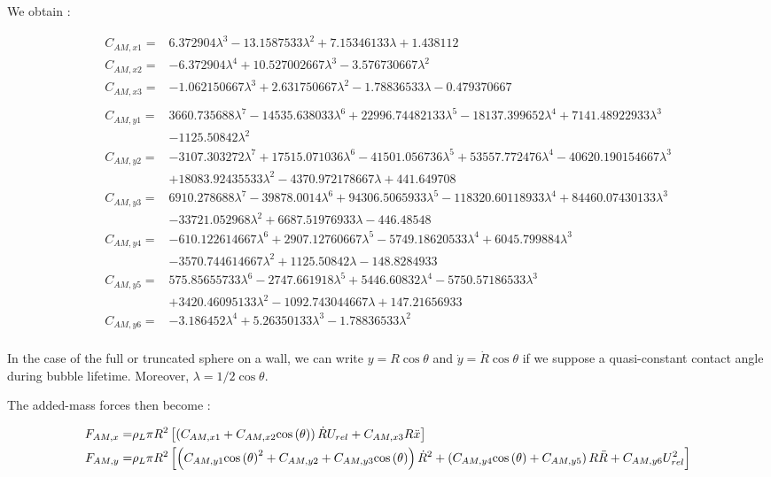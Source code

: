 We obtain :

\begin{align}
C_{AM,x1}=&6.372904 \lambda^{3} - 13.1587533\lambda^{2} + 7.15346133\lambda + 1.438112\\
C_{AM,x2}=&-6.372904\lambda^{4}+10.527002667\lambda^{3}-3.576730667\lambda^{2}\\
C_{AM,x3}=&-1.062150667\lambda^{3} + 2.631750667\lambda^{2}-1.78836533\lambda-0.479370667\\
\nonumber \\
\nonumber C_{AM,y1}=& 3660.735688\lambda^{7} - 14535.638033\lambda^{6} + 22996.74482133\lambda^{5} - 18137.399652\lambda^{4} + 7141.48922933\lambda^{3}\\& - 1125.50842 \lambda^{2}\\
\nonumber C_{AM,y2}=&-3107.303272\lambda^{7} + 17515.071036\lambda^{6} - 41501.056736\lambda^{5} + 53557.772476 \lambda^{4} - 40620.190154667\lambda^{3} \\& + 18083.92435533\lambda^{2} - 4370.972178667\lambda + 441.649708\\
\nonumber C_{AM,y3}=&6910.278688 \lambda^7 - 39878.0014 \lambda^6 + 94306.5065933 \lambda^5 - 118320.60118933 \lambda^4 + 84460.07430133 \lambda^3\\ &- 33721.052968 \lambda^2 + 6687.51976933 \lambda - 446.48548 \\
\nonumber C_{AM,y4}=&-610.122614667 \lambda^6 + 2907.12760667 \lambda^5 - 5749.18620533 \lambda^4 + 6045.799884 \lambda^3 \\&- 3570.744614667 \lambda^2 + 1125.50842 \lambda - 148.8284933 \\
\nonumber C_{AM,y5}=&575.85655733 \lambda^6 - 2747.661918 \lambda^5 + 5446.60832 \lambda^4 - 5750.57186533 \lambda^3 \\& + 3420.46095133 \lambda^2 - 1092.743044667 \lambda + 147.21656933 \\
C_{AM,y6}=& -3.186452 \lambda^4 + 5.26350133 \lambda^3 - 1.78836533 \lambda^2\\
\end{align}


\npar

In the case of the full or truncated sphere on a wall, we can write $y=R\cos{\theta}$ and $\dot{y}=\dot{R}\cos{\theta}$ if we suppose a quasi-constant contact angle during bubble lifetime. Moreover, $\lambda=1/2\cos{\theta}$. 

The added-mass forces then become :

\begin{align}
F_{AM,x}=&\rho_{L}\pi R^{2}\left[ \left( C_{AM,x1}+C_{AM,x2}\mathrm{cos}\left( \theta \right) \right)\dot{R}U_{rel}+C_{AM,x3}R\ddot{x} \right]\\
F_{AM,y}=&\rho_{L}\pi R^{2}\left[ \left( C_{AM,y1}\mathrm{cos}\left( \theta \right)^{2}+C_{AM,y2} + C_{AM,y3}\mathrm{cos}\left( \theta \right) \right)\dot{R}^{2}+\left( C_{AM,y4}\mathrm{cos}\left( \theta \right)+ C_{AM,y5} \right)R\ddot{R}+C_{AM,y6}U_{rel}^{2} \right]
\end{align}

